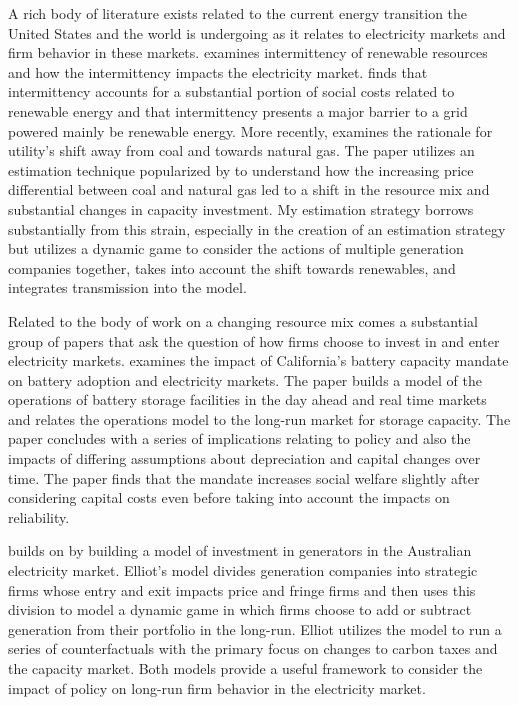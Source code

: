 \documentclass[12pt]{article}
\begin{document}
A rich body of literature exists related to the current energy transition the United States and the world is undergoing as it relates to electricity markets and firm behavior in these markets. \cite{gowrisankaran2016intermittency} examines intermittency of renewable resources and how the intermittency impacts the electricity market. \cite{gowrisankaran2016intermittency} finds that intermittency accounts for a substantial portion of social costs related to renewable energy and that intermittency presents a major barrier to a grid powered mainly be renewable energy. More recently, \cite{gowrisankaran2024energy} examines the rationale for utility's shift away from coal and towards natural gas. The paper utilizes an estimation technique popularized by \cite{gowrisankaran2024computable} to understand how the increasing price differential between coal and natural gas led to a shift in the resource mix and substantial changes in capacity investment. My estimation strategy borrows substantially from this strain, especially in the creation of an estimation strategy but utilizes a dynamic game to consider the actions of multiple generation companies together, takes into account the shift towards renewables, and integrates transmission into the model.

Related to the body of work on a changing resource mix comes a substantial group of papers that ask the question of how firms choose to invest in and enter electricity markets. \cite{butters2021soaking} examines the impact of California's battery capacity mandate on battery adoption and electricity markets. The paper builds a model of the operations of battery storage facilities in the day ahead and real time markets and relates the operations model to the long-run market for storage capacity. The paper concludes with a series of implications relating to policy and also the impacts of differing assumptions about depreciation and capital changes over time. The paper finds that the mandate increases social welfare slightly after considering capital costs even before taking into account the impacts on reliability. 

\cite{elliott2022investment} builds on \cite{butters2021soaking} by building a model of investment in generators in the Australian electricity market. Elliot's model divides generation companies into strategic firms whose entry and exit impacts price and fringe firms and then uses this division to model a dynamic game in which firms choose to add or subtract generation from their portfolio in the long-run. Elliot utilizes the model to run a series of counterfactuals with the primary focus on changes to carbon taxes and the capacity market. Both models provide a useful framework to consider the impact of policy on long-run firm behavior in the electricity market.
\end{document}
